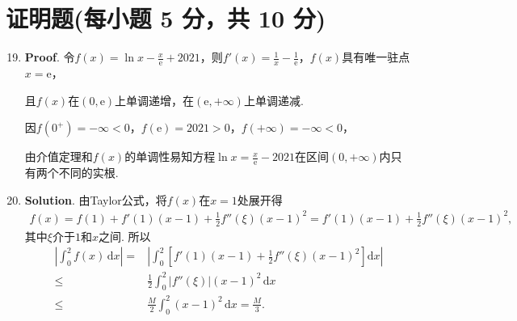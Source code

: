 \documentclass[../main.tex]{subfiles}
\begin{document}
\section{证明题(每小题 5 分，共 10 分)}
\begin{enumerate}
    \setcounter{enumi}{18}
    \item \textbf{Proof}. 令$f(x)=\ln x-\frac{x}{\mathrm{e}}+2021$，则$f'(x)
              =\frac{1}{x}-\frac{1}{\mathrm{e}}$，$f(x)$具有唯一驻点$x=\mathrm{e}$，

          且$f(x)$在$(0,\mathrm{e})$上单调递增，在$(\mathrm{e},+\infty)$上单调递减.

          因$f(0^{+})=-\infty<0$，$f(\mathrm{e})=2021>0$，$f(+\infty)=-\infty<0$，

          由介值定理和$f(x)$的单调性易知方程$\ln x = \frac{x}{\mathrm{e}}-2021$在区间$(
              0,+\infty)$内只有两个不同的实根.

    \item \textbf{Solution}. 由Taylor公式，将$f(x)$在$x=1$处展开得
          \[
              \begin{gathered}
                  f(x)=f(1)+f'(1)(x-1)+\frac{1}{2}f''(\xi)(x-1)^2=f'(1)(x-1)+\frac{1}{2}f''(\xi)(x-1)^2,
              \end{gathered}
          \]
          其中$\xi$介于$1$和$x$之间. 所以
          \[
              \begin{aligned}
                  \left|\int_{0}^{2}f(x)\,\mathrm{d}x\right| = {} & \left|\int_{0}^{2}\left[f'(1)(x-1)+\frac{1}{2}f''(\xi)(x-1)^{2}\right]\mathrm{d}x\right| \\
                  \leq  {}                                        & \frac{1}{2}\int_{0}^{2}|f''(\xi)|(x-1)^{2}\,\mathrm{d}x                                  \\
                  \leq  {}                                        & \frac{M}{2}\int_{0}^{2}(x-1)^{2}\,\mathrm{d}x = \frac{M}{3}.
              \end{aligned}
          \]
\end{enumerate}
\end{document}
